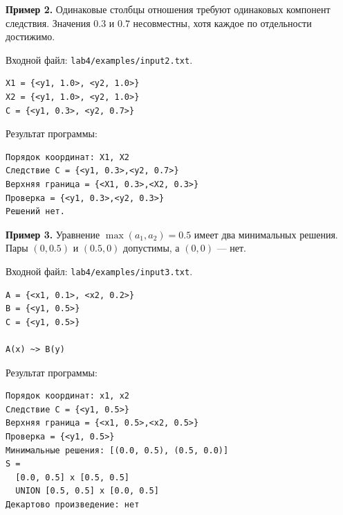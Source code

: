 \documentclass[14pt,a4paper]{extarticle}
\begin{document}
\par\medskip
\noindent\begin{minipage}{\textwidth}
\noindent\textbf{Пример 2.} Одинаковые столбцы отношения требуют одинаковых компонент следствия. Значения $0.3$ и $0.7$ несовместны, хотя каждое по отдельности достижимо.

Входной файл: \texttt{lab4/examples/input2.txt}.
\begin{Verbatim}[fontsize=\small,baselinestretch=1,frame=single,breaklines=true]
X1 = {<y1, 1.0>, <y2, 1.0>}
X2 = {<y1, 1.0>, <y2, 1.0>}
C = {<y1, 0.3>, <y2, 0.7>}
\end{Verbatim}

Результат программы:
\begin{Verbatim}[fontsize=\small,baselinestretch=1,frame=single,breaklines=true]
Порядок координат: X1, X2
Следствие C = {<y1, 0.3>,<y2, 0.7>}
Верхняя граница = {<X1, 0.3>,<X2, 0.3>}
Проверка = {<y1, 0.3>,<y2, 0.3>}
Решений нет.
\end{Verbatim}
\end{minipage}

\par\medskip
\noindent\begin{minipage}{\textwidth}
\noindent\textbf{Пример 3.} Уравнение $\max(a_1,a_2)=0.5$ имеет два минимальных решения. Пары $(0,0.5)$ и $(0.5,0)$ допустимы, а $(0,0)$ --- нет.

Входной файл: \texttt{lab4/examples/input3.txt}.
\begin{Verbatim}[fontsize=\small,baselinestretch=1,frame=single,breaklines=true]
A = {<x1, 0.1>, <x2, 0.2>}
B = {<y1, 0.5>}
C = {<y1, 0.5>}

A(x) ~> B(y)
\end{Verbatim}

Результат программы:
\begin{Verbatim}[fontsize=\small,baselinestretch=1,frame=single,breaklines=true]
Порядок координат: x1, x2
Следствие C = {<y1, 0.5>}
Верхняя граница = {<x1, 0.5>,<x2, 0.5>}
Проверка = {<y1, 0.5>}
Минимальные решения: [(0.0, 0.5), (0.5, 0.0)]
S =
  [0.0, 0.5] x [0.5, 0.5]
  UNION [0.5, 0.5] x [0.0, 0.5]
Декартово произведение: нет
\end{Verbatim}
\end{minipage}
\end{document}
